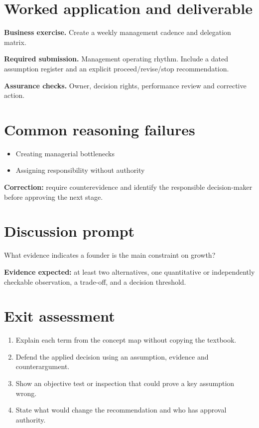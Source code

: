 \documentclass[11pt,letterpaper]{article}
\begin{document}
\section{Worked application and deliverable}
\textbf{Business exercise.} Create a weekly management cadence and delegation matrix.\par\textbf{Required submission.} Management operating rhythm. Include a dated assumption register and an explicit proceed/revise/stop recommendation.\par\textbf{Assurance checks.} Owner, decision rights, performance review and corrective action.
\section{Common reasoning failures}
\begin{itemize}[leftmargin=*,itemsep=3pt]
\item Creating managerial bottlenecks
\item Assigning responsibility without authority
\end{itemize}
\noindent\textbf{Correction:} require counterevidence and identify the responsible decision-maker before approving the next stage.
\section{Discussion prompt}
What evidence indicates a founder is the main constraint on growth?\par\medskip\textbf{Evidence expected:} at least two alternatives, one quantitative or independently checkable observation, a trade-off, and a decision threshold.
\section{Exit assessment}
\begin{enumerate}[leftmargin=*,itemsep=5pt]
\item Explain each term from the concept map without copying the textbook.
\item Defend the applied decision using an assumption, evidence and counterargument.
\item Show an objective test or inspection that could prove a key assumption wrong.
\item State what would change the recommendation and who has approval authority.
\end{enumerate}

\end{document}
